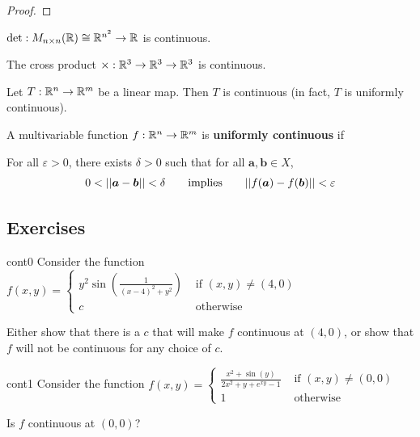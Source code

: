     \begin{proof}
    \end{proof}
    
    \begin{theorem}
    $\det : M_{n \times n}(\mathbb{R}) \cong \mathbb{R}^{n^2} \to \mathbb{R}$ is continuous.
    \end{theorem}
    
    \begin{corollary}
    The cross product $\times : \mathbb{R}^3 \to \mathbb{R}^3 \to \mathbb{R}^3$ is continuous.
    \end{corollary}
    
    
    
    \begin{theorem}
    Let $T: \mathbb{R}^n \to \mathbb{R}^m$ be a linear map.  Then $T$ is continuous (in fact, $T$ is uniformly continuous).
    \end{theorem}
    
    \begin{definition}
    A multivariable function $f : \mathbb{R}^n \to \mathbb{R}^m$ is \textbf{uniformly continuous} if 
    
    \vspace{1em}
    For all $\varepsilon>0$, there exists $\delta > 0$ such that for all $\bm{a}, \bm{b} \in X$, $$0 < ||\bm{a} - \bm{b} || < \delta \qquad \textnormal{implies} \qquad ||f(\bm{a}) - f(\bm{b}) || < \varepsilon$$
    
    \end{definition}
    
    
    
\subsection{Exercises}

\begin{problem}{cont0}
Consider the function  $f(x,y) = \left\{
		\begin{array}{ll}
			y^2\sin(\frac{1}{(x-4)^2 + y^2}) & \text{ if } (x,y) \neq (4,0) \\
			c & \text{ otherwise } 
		\end{array}
		\right.$
		
		Either show that there is a $c$ that will make $f$ continuous at $(4,0)$, or show that $f$ will not be continuous for any choice of $c$.
\end{problem}

\begin{problem}{cont1}
Consider the function $f(x,y) = \left\{
		\begin{array}{ll}
			\frac{x^2 + \sin(y)}{2x^2 + y +e^{xy}-1} & \text{ if } (x,y) \neq (0,0) \\
			1 & \text{ otherwise } 
		\end{array}
		\right.$
		
		Is $f$ continuous at $(0,0)$?
\end{problem}



